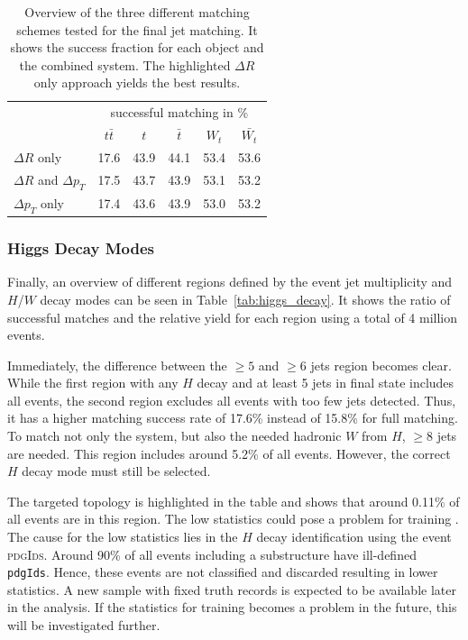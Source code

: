 \documentclass[bachelor,ngerman,english]{GAUBM}
\begin{document}
\begin{table}
    \centering
    \caption{Overview of the three different matching schemes tested for the final jet matching. It shows the success fraction for each object and the combined \ttbar system. The highlighted $\Delta R$ only approach yields the best results.}
    \begin{tabular}{l|c|c|c|c|c|}
        &\multicolumn{5}{c|}{successful matching in \%}\\
        & $t\bar{t}$ & $t$ & $\bar{t}$ & $W_t$ & $\bar{W_t}$\\
        \hline
        \rowcolor{highlighter!40}
        $\Delta R$ only & 17.6 & 43.9 & 44.1 & 53.4 & 53.6\\
        $\Delta R$ and $\Delta p_T$ & 17.5 & 43.7 & 43.9 & 53.1 & 53.2\\
        $\Delta p_T$ only & 17.4 & 43.6 & 43.9 & 53.0 & 53.2\\
    \end{tabular}
    \label{tab:final_selection}
\end{table}

\subsubsection*{Higgs Decay Modes}
Finally, an overview of different regions defined by the event jet multiplicity and $H$/$W$ decay modes can be seen in Table~\ref{tab:higgs_decay}. It shows the ratio of successful matches and the relative yield for each region using a total of 4 million events.

Immediately, the difference between the $\geq5$ and $\geq6$ jets region becomes clear. While the first region with any $H$ decay and at least 5 jets in final state includes all events, the second region excludes all events with too few jets detected. Thus, it has a higher matching success rate of 17.6\% instead of 15.8\% for full \ttbar matching. To match not only the \ttbar system, but also the needed hadronic $W$ from $H$, $\geq8$ jets are needed. This region includes around 5.2\% of all events. However, the correct $H$ decay mode must still be selected.

The targeted topology is highlighted in the table and shows that around 0.11\% of all events are in this region. The low statistics could pose a problem for training \spanet. The cause for the low statistics lies in the $H$ decay identification using the event \textsc{pdgIds}. Around 90\% of all events including a \HWW substructure have ill-defined \texttt{pdgIds}. Hence, these events are not classified and discarded resulting in lower statistics. A new sample with fixed truth records is expected to be available later in the analysis. If the statistics for training \spanet becomes a problem in the future, this will be investigated further.
\end{document}
